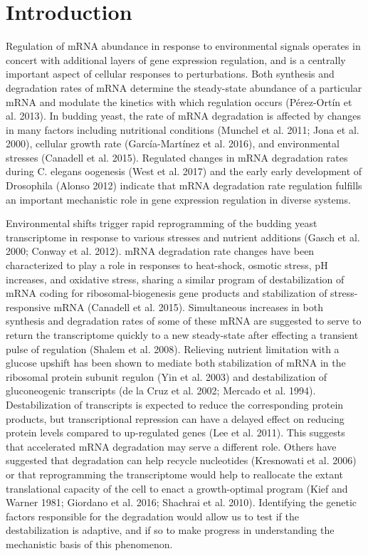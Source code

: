 \section{Introduction}

Regulation of mRNA abundance in
response to environmental signals operates in concert with additional
layers of gene expression regulation, and is a centrally important
aspect of cellular responses to perturbations. Both synthesis and
degradation rates of mRNA determine the steady-state abundance of a
particular mRNA and modulate the kinetics with which regulation occurs
(Pérez-Ortín et al. 2013). In budding yeast, the rate of mRNA
degradation is affected by changes in many factors including
nutritional conditions  (Munchel et al. 2011; Jona et al. 2000),
cellular growth rate (García-Martínez et al. 2016), and environmental
stresses (Canadell et al. 2015). Regulated changes in mRNA degradation
rates during C. elegans oogenesis (West et al. 2017) and the early
early development of Drosophila (Alonso 2012) indicate that mRNA
degradation rate regulation fulfills an important mechanistic role in
gene expression regulation in diverse systems.  

Environmental shifts
trigger rapid reprogramming of the budding yeast transcriptome in
response to various stresses and nutrient additions (Gasch et al.
2000; Conway et al. 2012). mRNA degradation rate changes have been
characterized to play a role in responses to heat-shock, osmotic
stress, pH increases, and oxidative stress, sharing a similar program
of destabilization of mRNA coding for ribosomal-biogenesis gene
products and stabilization of stress-responsive mRNA (Canadell et al.
2015). Simultaneous increases in both synthesis and degradation rates
of some of these mRNA are suggested to serve to return the
transcriptome quickly to a new steady-state after effecting a
transient pulse of regulation (Shalem et al. 2008). Relieving nutrient
limitation with a glucose upshift has been shown to mediate both
stabilization of mRNA in the ribosomal protein subunit regulon (Yin et
al. 2003) and destabilization of gluconeogenic transcripts (de la Cruz
et al. 2002; Mercado et al. 1994). Destabilization of transcripts is
expected to reduce the corresponding protein products, but
transcriptional repression can have a delayed effect on reducing
protein levels compared to up-regulated genes (Lee et al. 2011). This
suggests that accelerated mRNA degradation may serve a different role.
Others have suggested that degradation can help recycle nucleotides
(Kresnowati et al. 2006) or that reprogramming the transcriptome would
help to reallocate the extant translational capacity of the cell to
enact a growth-optimal program (Kief and Warner 1981; Giordano et al.
2016; Shachrai et al. 2010). Identifying the genetic factors
responsible for the degradation would allow us to test if the
destabilization is adaptive, and if so to make progress in
understanding the mechanistic basis of this phenomenon. 

